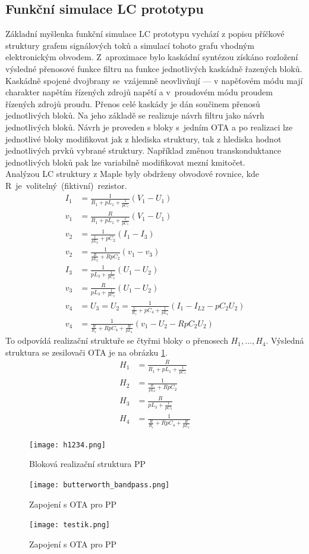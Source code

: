 \subsection{Funkční simulace LC prototypu}\label{s:KASK2}
\noindent Základní myšlenka funkční simulace LC prototypu vychází z popisu příčkové struktury grafem signálových toků a simulací tohoto grafu vhodným elektronickým obvodem. Z~aproximace bylo kaskádní syntézou získáno rozložení výsledné přenosové funkce filtru na funkce jednotlivých kaskádně řazených bloků. Kaskádně spojené dvojbrany se~vzájemně neovlivňují --- v napěťovém módu mají charakter napětím řízených zdrojů napětí a v~proudovém módu proudem řízených zdrojů proudu. Přenos celé kaskády je dán součinem přenosů jednotlivých bloků. Na jeho základě se realizuje návrh filtru jako návrh jednotlivých bloků. Návrh je proveden s bloky s~jedním OTA a po realizaci lze jednotlivé bloky modifikovat jak z hlediska struktury, tak z hlediska hodnot jednotlivých prvků vybrané struktury. Například změnou transkonduktance jednotlivých bloků pak lze variabilně modifikovat mezní kmitočet.\\
\newpage
\noindent Analýzou LC struktury z Maple byly obdrženy obvodové rovnice, kde R~je~volitelný~(fiktivní)~rezistor.
\begin{align}
I_1 &= \frac{1}{R_1 + pL_1 + \frac{1}{pC_1}}(V_1 - U_1)\\
v_1 & = \frac{R}{R_1 + pL_1 + \frac{1}{pC_1}}(V_1 - U_1)\\
v_2 &= \frac{1}{\frac{1}{pL_2} + pC_2}(I_1 - I_{3})\\
v_2 &= \frac{1}{\frac{R}{pL_2} + RpC_2}(v_1 - v_{3})\\
I_{3} &= \frac{1}{pL_3 + \frac{1}{pC_3}}(U_1 - U_2)\\
v_{3} &= \frac{R}{pL_3 + \frac{1}{pC_3}}(U_1 - U_2)\\
v_4 &= U_3 = U_2 = \frac{1}{\frac{1}{R_z}+pC_4 + \frac{1}{pL_4}}(I_1 - I_{L2} - pC_2U_2)\\
v_4 &= \frac{1}{\frac{R}{R_z}+RpC_4 + \frac{R}{pL_4}}(v_1 - U_2 - RpC_2 U_2)
\end{align}
\noindent To odpovídá realizační struktuře se čtyřmi bloky o přenosech $H_1, \ldots,H_4$. Výsledná struktura se zesilovači OTA je na obrázku \ref{s:OBR}.
\begin{align}
H_1 & = \frac{R}{R_1 + pL_1 + \frac{1}{pC_1}}\\
H_2 &= \frac{1}{\frac{R}{pL_2} + RpC_2}\\
H_3 &= \frac{R}{pL_3 + \frac{1}{pC_3}}\\
H_4 &= \frac{1}{\frac{R}{R_z}+RpC_4 + \frac{R}{pL_4}}
\end{align}
\begin{figure}[h]
\centering
\texttt{[image: h1234.png]}
\caption{Bloková realizační struktura PP}
\end{figure}
\begin{figure}[h]
\centering
\texttt{[image: butterworth\_bandpass.png]}
\caption{Zapojení s OTA pro PP\label{s:OBR}}
\end{figure}
\begin{figure}[h]
\centering
\texttt{[image: testik.png]}
\caption{Zapojení s OTA pro PP\label{s:TESTIK}}
\end{figure}
\newpage
